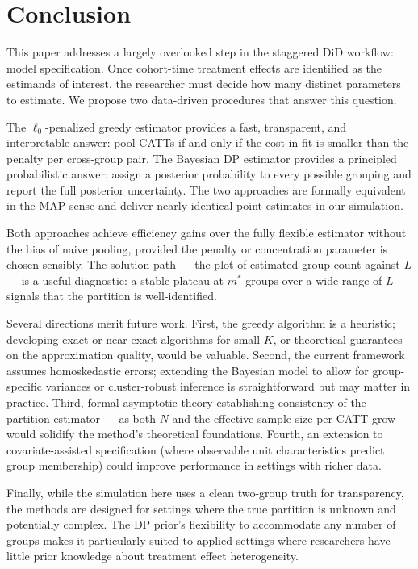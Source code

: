 \documentclass[margin=3in, 12pt]{article}
\newcommand{\1}{\mathbbm{1}}
\begin{document}
\section{Conclusion}
\label{sec:conc}

This paper addresses a largely overlooked step in the staggered DiD workflow:
model specification. Once cohort-time treatment effects are identified as the
estimands of interest, the researcher must decide how many distinct parameters
to estimate. We propose two data-driven procedures that answer this question.

The $\ell_0$-penalized greedy estimator provides a fast, transparent, and
interpretable answer: pool CATTs if and only if the cost in fit is smaller
than the penalty per cross-group pair. The Bayesian DP estimator provides
a principled probabilistic answer: assign a posterior probability to every
possible grouping and report the full posterior uncertainty. The two approaches
are formally equivalent in the MAP sense and deliver nearly identical point
estimates in our simulation.

Both approaches achieve efficiency gains over the fully flexible estimator
without the bias of naive pooling, provided the penalty or concentration
parameter is chosen sensibly. The solution path --- the plot of estimated
group count against $L$ --- is a useful diagnostic: a stable plateau
at $m^*$ groups over a wide range of $L$ signals that the partition is
well-identified.

Several directions merit future work. First, the greedy algorithm is a
heuristic; developing exact or near-exact algorithms for small $K$, or
theoretical guarantees on the approximation quality, would be valuable.
Second, the current framework assumes homoskedastic errors; extending
the Bayesian model to allow for group-specific variances or cluster-robust
inference is straightforward but may matter in practice. Third, formal
asymptotic theory establishing consistency of the partition estimator ---
as both $N$ and the effective sample size per CATT grow --- would solidify
the method's theoretical foundations. Fourth, an extension to covariate-assisted
specification (where observable unit characteristics predict group membership)
could improve performance in settings with richer data.

Finally, while the simulation here uses a clean two-group truth for
transparency, the methods are designed for settings where the true partition
is unknown and potentially complex. The DP prior's flexibility to accommodate
any number of groups makes it particularly suited to applied settings where
researchers have little prior knowledge about treatment effect heterogeneity.

\newpage


\end{document}
